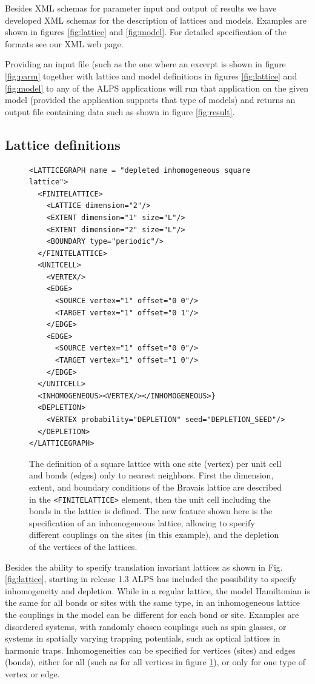\documentclass[12pt]{iopart}
\begin{document}
Besides XML schemas for parameter input and output of results we have developed XML schemas for the description of lattices and models. Examples are shown in figures \ref{fig:lattice} and \ref{fig:model}. For detailed specification of the formats see our XML web page.\cite{xmlschema} 

Providing an input file (such as the one where an excerpt is shown in figure \ref{fig:parm} together with lattice and model definitions in figures  \ref{fig:lattice} and \ref{fig:model} to any of the ALPS applications will run that application on the given model (provided the application supports that type of models) and returns an output file containing data such as shown in figure \ref{fig:result}. 

\subsection{Lattice definitions}

\begin{figure}
\begin{lstlisting}
<LATTICEGRAPH name = "depleted inhomogeneous square lattice">
  <FINITELATTICE>
    <LATTICE dimension="2"/>  
    <EXTENT dimension="1" size="L"/>
    <EXTENT dimension="2" size="L"/>
    <BOUNDARY type="periodic"/>  
  </FINITELATTICE>
  <UNITCELL>
    <VERTEX/>
    <EDGE>
      <SOURCE vertex="1" offset="0 0"/>
      <TARGET vertex="1" offset="0 1"/>
    </EDGE>
    <EDGE>
      <SOURCE vertex="1" offset="0 0"/>
      <TARGET vertex="1" offset="1 0"/>
    </EDGE>
  </UNITCELL> 
  <INHOMOGENEOUS><VERTEX/></INHOMOGENEOUS>}
  <DEPLETION>
    <VERTEX probability="DEPLETION" seed="DEPLETION_SEED"/>
  </DEPLETION>
</LATTICEGRAPH>
\end{lstlisting}

\caption{The definition of a square lattice with one site (vertex) per
unit cell and bonds (edges) only to nearest neighbors. First the
dimension, extent, and boundary conditions of the Bravais lattice are
described in the {\tt <FINITELATTICE>} element, then the unit cell
including the bonds in the lattice is defined. The new feature shown here is the specification of an inhomogeneous lattice, allowing to specify different couplings on the sites (in this example), and the depletion of the vertices of the lattices.}
\label{fig:deplattice}
\end{figure}
Besides the ability to specify translation invariant lattices as shown in Fig. \ref{fig:lattice}, starting in release 1.3 ALPS has included the possibility to specify inhomogeneity and depletion. While in a regular lattice, the model Hamiltonian is the same for all bonds or sites with the same type, in an inhomogeneous lattice the couplings in the model can be different for each bond or site. Examples are disordered systems, with randomly chosen couplings such as spin glasses, or systems in spatially varying trapping potentials, such as optical lattices in harmonic traps.
Inhomogeneities can be specified for vertices (sites) and edges (bonds), either for all (such as for all vertices in figure \ref{fig:deplattice}), or only for one type of vertex or edge. 
\end{document}

